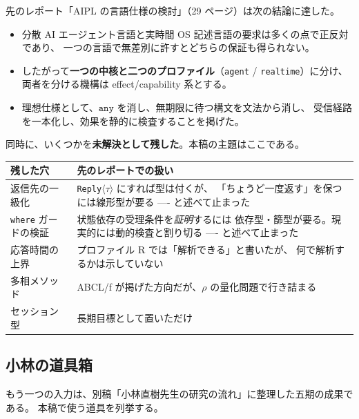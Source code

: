 \documentclass[11pt,a4paper]{ltjsarticle}
\theoremstyle{remark}
\newcommand{\ty}[1]{\ensuremath{\mathtt{#1}}}
\begin{document}
先のレポート「AIPL の言語仕様の検討」（29 ページ）は次の結論に達した。

\begin{itemize}
\item 分散 AI エージェント言語と実時間 OS 記述言語の要求は多くの点で正反対であり、
  一つの言語で無差別に許すとどちらの保証も得られない。
\item したがって\textbf{一つの中核と二つのプロファイル}（\texttt{agent} /
  \texttt{realtime}）に分け、両者を分ける機構は effect/capability 系とする。
\item 理想仕様として、\ty{any} を消し、無期限に待つ構文を文法から消し、
  受信経路を一本化し、効果を静的に検査することを掲げた。
\end{itemize}

同時に、いくつかを\textbf{未解決として残した}。本稿の主題はここである。

\begin{center}
\small
\begin{tabular}{@{}lp{9.2cm}@{}}
\toprule
残した穴 & 先のレポートでの扱い \\
\midrule
返信先の一級化 & \texttt{Reply}$\langle\tau\rangle$ にすれば型は付くが、
  「ちょうど一度返す」を保つには線形型が要る ---- と述べて止まった \\
\texttt{where} ガードの検証 & 状態依存の受理条件を\emph{証明}するには
  依存型・篩型が要る。現実的には動的検査と割り切る ---- と述べて止まった \\
応答時間の上界 & プロファイル R では「解析できる」と書いたが、
  何で解析するかは示していない \\
多相メソッド & ABCL/f が掲げた方向だが、$\rho$ の量化問題で行き詰まる \\
セッション型 & 長期目標として置いただけ \\
\bottomrule
\end{tabular}
\end{center}

\subsection{小林の道具箱}

もう一つの入力は、別稿「小林直樹先生の研究の流れ」に整理した五期の成果である。
本稿で使う道具を列挙する。
\end{document}
